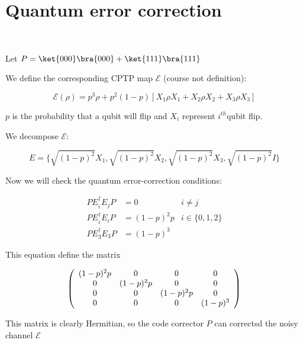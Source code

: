 
\section{Quantum error correction}

~

Let $P = \ket{000}\bra{000} + \ket{111}\bra{111}$

We define the corresponding CPTP map $\mathcal E$ (course not definition):

$$\mathcal E(\rho) = p^3\rho + p^2(1-p)[X_1\rho X_1 + X_2\rho X_2 + X_3\rho X_3]$$

$p$ is the probability that a qubit will flip and $X_i$ represent
$i^{th}$qubit flip.

We decompose $\mathcal E$:

$$E = \{\sqrt{(1-p)^2}X_1, \sqrt{(1-p)^2}X_2, \sqrt{(1-p)^2}X_3, \sqrt{(1-p)^2}I\}$$

Now we will check the quantum error-correction conditions:

\begin{align*}
  PE_i^\dagger E_j P &= 0 & i\not = j \\
  PE_i^\dagger E_i P &= (1-p)^2p & i \in \{0, 1, 2\} \\
  PE_3^\dagger E_3 P &= (1-p)^3
\end{align*}

This equation define the matrix

\begin{align*}
  \left(
  \begin{array}{c c c c}
  (1-p)^2p & 0 & 0 & 0 \\
  0 &(1-p)^2p & 0 & 0 \\
  0 & 0 & (1-p)^2p & 0 \\
  0 & 0 & 0 &(1-p)^3  \\
  \end{array}
  \right)
\end{align*}

This matrix is clearly Hermitian, so the code corrector $P$ can correctsd the
noisy channel $\mathcal E$
